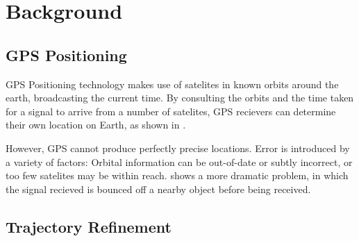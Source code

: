 \section{Background}

\subsection{GPS Positioning}


GPS Positioning technology makes use of satelites in known orbits around the earth, broadcasting the current time. By consulting the orbits and the time taken for a signal to arrive from a number of satelites, GPS recievers can determine their own location on Earth, as shown in .



However, GPS cannot produce perfectly precise locations. Error is introduced by a variety of factors: Orbital information can be out-of-date or subtly incorrect, or too few satelites may be within reach.  shows a more dramatic problem, in which the signal recieved is bounced off a nearby object before being received.

\subsection{Trajectory Refinement}


